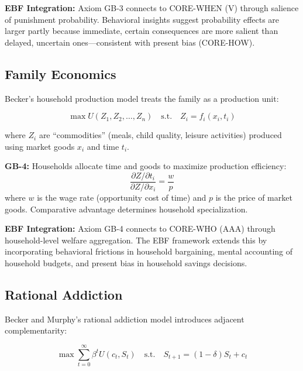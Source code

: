 \textbf{EBF Integration:} Axiom GB-3 connects to CORE-WHEN (V) through salience of punishment probability. Behavioral insights suggest probability effects are larger partly because immediate, certain consequences are more salient than delayed, uncertain ones---consistent with present bias (CORE-HOW).

\subsection{Family Economics}
\label{subsec:gb-family}

Becker's household production model \citep{becker1965theory, becker1981treatise} treats the family as a production unit:

\begin{equation}
\max U(Z_1, Z_2, \ldots, Z_n) \quad \text{s.t.} \quad Z_i = f_i(x_i, t_i)
\label{eq:gb-household}
\end{equation}

where $Z_i$ are ``commodities'' (meals, child quality, leisure activities) produced using market goods $x_i$ and time $t_i$.

\begin{axiom}
\label{ax:gb-4}
\textbf{GB-4:} Households allocate time and goods to maximize production efficiency:
\begin{equation}
\frac{\partial Z/\partial t_i}{\partial Z/\partial x_i} = \frac{w}{p}
\end{equation}
where $w$ is the wage rate (opportunity cost of time) and $p$ is the price of market goods. Comparative advantage determines household specialization.
\end{axiom}

\textbf{EBF Integration:} Axiom GB-4 connects to CORE-WHO (AAA) through household-level welfare aggregation. The EBF framework extends this by incorporating behavioral frictions in household bargaining, mental accounting of household budgets, and present bias in household savings decisions.

\subsection{Rational Addiction}
\label{subsec:gb-addiction}

Becker and Murphy's rational addiction model \citep{PAP-BeckerMurphy1988} introduces adjacent complementarity:

\begin{equation}
\max \sum_{t=0}^{\infty} \beta^t U(c_t, S_t) \quad \text{s.t.} \quad S_{t+1} = (1-\delta)S_t + c_t
\label{eq:gb-addiction}
\end{equation}

